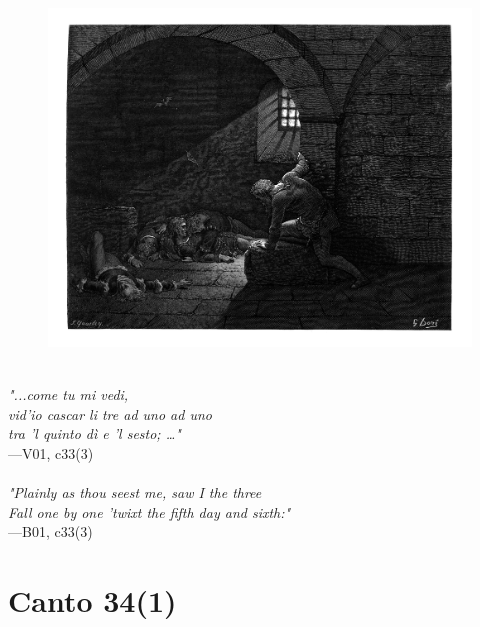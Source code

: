 \documentclass[../Dore_vision.tex]{subfiles}
\begin{document}
\begin{figure}[ht]
\centering
\includegraphics[height=\figsize]{illustrations/book_1/V01, c33(3).jpg}
\end{figure}

\begin{center}
\begin{minipage}{0.8\linewidth}
\textit{\\
"...come tu mi vedi,\\vid’io cascar li tre ad uno ad uno\\tra ’l quinto dì e ’l sesto; …"} \\
—V01, c33(3) \\~\\
\textit{"Plainly as thou seest me, saw I the three\\Fall one by one 'twixt the fifth day and sixth:"} \\
—B01, c33(3)
\end{minipage}
\end{center}

\newpage

\section{Canto 34(1)}
\end{document}
